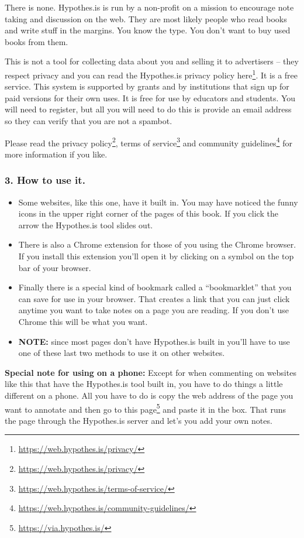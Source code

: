 \documentclass[
  12pt, openany]{book}
\makeatletter
\renewcommand{\href}[2]{#2\footnote{\url{#1}}}
\newenvironment{kframe}{%
\medskip{}
\setlength{\fboxsep}{.8em}
 \def\at@end@of@kframe{}%
 \ifinner\ifhmode%
  \def\at@end@of@kframe{\end{minipage}}%
  \begin{minipage}{\columnwidth}%
 \fi\fi%
 \def\FrameCommand##1{\hskip\@totalleftmargin \hskip-\fboxsep
 \colorbox{shadecolor}{##1}\hskip-\fboxsep
     \hskip-\linewidth \hskip-\@totalleftmargin \hskip\columnwidth}%
 \MakeFramed {\advance\hsize-\width
   \@totalleftmargin\z@ \linewidth\hsize
   \@setminipage}}%
 {\par\unskip\endMakeFramed%
 \at@end@of@kframe}
\newenvironment{rmdblock}[1]
  {
  \begin{itemize}
  \renewcommand{\labelitemi}{
    \raisebox{-.7\height}[0pt][0pt]{
      {\setkeys{Gin}{width=3em,keepaspectratio}\texttt{[image: img/\#1]}}
    }
  }
  \setlength{\fboxsep}{1em}
  \begin{kframe}
  \item
  }
  {
  \end{kframe}
  \end{itemize}
  }
\newenvironment{note}
  {\begin{rmdblock}{note}}
  {\end{rmdblock}}
\makeatother
\begin{document}
There is none. Hypothes.is is run by a non-profit on a mission to encourage note taking and discussion on the web. They are most likely people who read books and write stuff in the margins. You know the type. You don't want to buy used books from them.

This is not a tool for collecting data about you and selling it to advertisers -- they respect privacy and you can read \href{https://web.hypothes.is/privacy/}{the Hypothes.is privacy policy here}. It is a free service. This system is supported by grants and by institutions that sign up for paid versions for their own uses. It is free for use by educators and students. You will need to register, but all you will need to do this is provide an email address so they can verify that you are not a spambot.

Please read the \href{https://web.hypothes.is/privacy/}{privacy policy}, \href{https://web.hypothes.is/terms-of-service/}{terms of service} and \href{https://web.hypothes.is/community-guidelines/}{community guidelines} for more information if you like.

\hypertarget{how-to-use-it.}{%
\subsubsection*{3. How to use it.}\label{how-to-use-it.}}


\begin{itemize}
\item
  Some websites, like this one, have it built in. You may have noticed the funny icons in the upper right corner of the pages of this book. If you click the arrow the Hypothes.is tool slides out.
\item
  There is also a Chrome extension for those of you using the Chrome browser. If you install this extension you'll open it by clicking on a symbol on the top bar of your browser.
\item
  Finally there is a special kind of bookmark called a ``bookmarklet'' that you can save for use in your browser. That creates a link that you can just click anytime you want to take notes on a page you are reading. If you don't use Chrome this will be what you want.
\item
  \textbf{NOTE:} since most pages don't have Hypothes.is built in you'll have to use one of these last two methods to use it on other websites.
\end{itemize}

\begin{note}

\textbf{Special note for using on a phone:} Except for when commenting on websites like this that have the Hypothes.is tool built in, you have to do things a little different on a phone. All you have to do is copy the web address of the page you want to annotate and then \href{https://via.hypothes.is/}{go to this page} and paste it in the box. That runs the page through the Hypothes.is server and let's you add your own notes.

\end{note}
\end{document}
